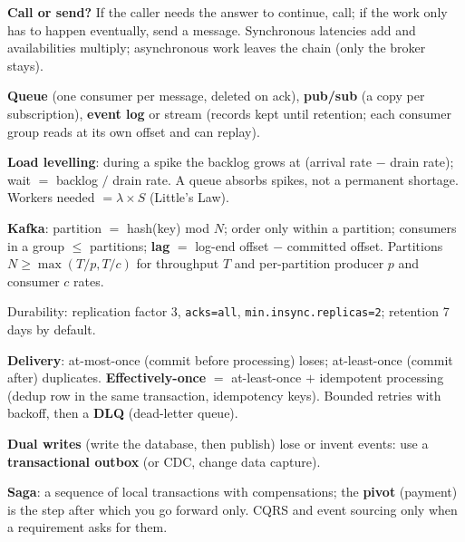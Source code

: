 \stages{\stDesign\ \stEstimate\ \stDeep}

\begin{know}
  \item \textbf{Call or send?} If the caller needs the answer to continue, call; if the work only has to happen eventually, send a message. Synchronous latencies add and availabilities multiply; asynchronous work leaves the chain (only the broker stays).
  \item \textbf{Queue} (one consumer per message, deleted on ack), \textbf{pub/sub} (a copy per subscription), \textbf{event log} or stream (records kept until retention; each consumer group reads at its own offset and can replay).
  \item \textbf{Load levelling}: during a spike the backlog grows at (arrival rate $-$ drain rate); wait $=$ backlog $/$ drain rate. A queue absorbs spikes, not a permanent shortage. Workers needed $= \lambda \times S$ (Little's Law).
  \item \textbf{Kafka}: partition $=$ hash(key) mod $N$; order only within a partition; consumers in a group $\le$ partitions; \textbf{lag} $=$ log-end offset $-$ committed offset. Partitions $N \ge \max(T/p, T/c)$ for throughput $T$ and per-partition producer $p$ and consumer $c$ rates.
  \item Durability: replication factor 3, \texttt{acks=all}, \texttt{min.insync.replicas=2}; retention 7 days by default.
  \item \textbf{Delivery}: at-most-once (commit before processing) loses; at-least-once (commit after) duplicates. \textbf{Effectively-once} $=$ at-least-once $+$ idempotent processing (dedup row in the same transaction, idempotency keys). Bounded retries with backoff, then a \textbf{DLQ} (dead-letter queue).
  \item \textbf{Dual writes} (write the database, then publish) lose or invent events: use a \textbf{transactional outbox} (or CDC, change data capture).
  \item \textbf{Saga}: a sequence of local transactions with compensations; the \textbf{pivot} (payment) is the step after which you go forward only. CQRS and event sourcing only when a requirement asks for them.
\end{know}

